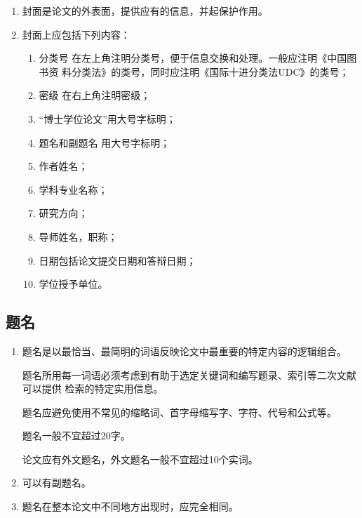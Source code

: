 \documentclass[oneside, phd]{njuthesis}
\begin{document}
\begin{enumerate}
\item 封面是论文的外表面，提供应有的信息，并起保护作用。

\item 封面上应包括下列内容：

\begin{enumerate}

\item 分类号  在左上角注明分类号，便于信息交换和处理。一般应注明《中国图书资
料分类法》的类号，同时应注明《国际十进分类法UDC》的类号；

\item 密级  在右上角注明密级；

\item “博士学位论文”用大号字标明；

\item 题名和副题名   用大号字标明；

\item 作者姓名；

\item 学科专业名称；

\item 研究方向；
\item 导师姓名，职称；
\item 日期包括论文提交日期和答辩日期；
\item 学位授予单位。
\end{enumerate}
\end{enumerate}

\subsection{题名}

\begin{enumerate}

\item 题名是以最恰当、最简明的词语反映论文中最重要的特定内容的逻辑组合。

题名所用每一词语必须考虑到有助于选定关键词和编写题录、索引等二次文献可以提供
检索的特定实用信息。

题名应避免使用不常见的缩略词、首字母缩写字、字符、代号和公式等。

题名一般不宜超过20字。

论文应有外文题名，外文题名一般不宜超过10个实词。

\item 可以有副题名。
\item 题名在整本论文中不同地方出现时，应完全相同。
\end{enumerate}
\end{document}
